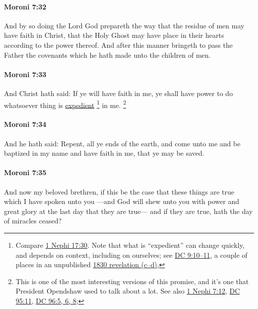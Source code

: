 		\paragraph{Moroni 7:32} %
			\label{MORONI-7-32}

			And by so doing the Lord God prepareth the way
			that the residue of men may have faith in Christ,
			that the Holy Ghost may have place in their hearts
			according to the power thereof.
			And after this manner bringeth to pass the Father the covenants
			which he hath made unto the children of men.

		\paragraph{Moroni 7:33} %
			\label{MORONI-7-33}

			And Christ hath said:
			If ye will have faith in me,
			ye shall have power to do whatsoever thing is \hyperref[EXPEDIENT]{expedient}%
				\footnote{%
					Compare \hyperref[1NEPHI-17-30]{1 Nephi 17:30}. Note that what is ``expedient'' can change quickly, and depends on context, including on ourselves; see \hyperref[DC9-10]{DC 9:10--11}, a couple of places in an unpublished \hyperlink{EMS-1830-JS-CIR-EARLY-1830-c}{1830 revelation (c--d)}, 
					}
			in me.%
				\footnote{%
					This is one of the most interesting versions of this promise, and it's one that President Opendshaw used to talk about a lot. See also \hyperref[1NEPHI-7-12]{1 Nephi 7:12}, \hyperref[DC95-11]{DC 95:11}, \hyperref[DC96-5]{DC 96:5, 6, 8};
					} 

		\paragraph{Moroni 7:34} %
			\label{MORONI-7-34}

			And he hath said:
			Repent, all ye ends of the earth, and come unto me
			and be baptized in my name and have faith in me,
			that ye may be saved.

		\paragraph{Moroni 7:35} %
			\label{MORONI-7-35}

			And now my beloved brethren,
			if this be the case that these things are true
			which I have spoken unto you
			---and God will shew unto you
			with power and great glory at the last day
			that they are true---
			and if they are true,
			hath the day of miracles ceased?

